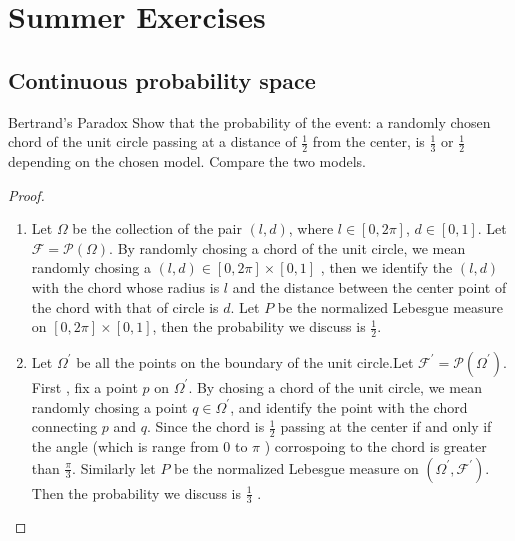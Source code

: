 \documentclass[../main.tex]{subfiles}
\begin{document}
\ifSubfilesClassLoaded{

    \tableofcontents
    
}{}

\chapter{ Summer Exercises }

\section{Continuous probability space}

\begin{exercise}{Bertrand's Paradox}{}
    Show that the probability of the event: a randomly chosen chord of the unit circle passing at a distance of $\frac{1}{2}$ from the center, is $\frac{1}{3}$ or $\frac{1}{2}$ depending on the chosen model. Compare the two models.
\end{exercise}

\begin{proof}
    \begin{enumerate}
        \item Let \(   \Omega   \) be the collection of the pair \(  \left( l, d \right)   \), where \(  l\in \left[ 0,2 \pi \right]   \), \(  d \in \left[ 0,1 \right]   \).  Let \(  \mathcal{F}= \mathcal{P}\left(  \Omega  \right)   \).  By randomly chosing a chord of the unit circle, we mean randomly chosing a \(  \left( l,d \right) \in \left[ 0,2 \pi \right]\times \left[ 0,1 \right]     \) , then we identify the \(  \left( l,d \right)   \) with the chord whose radius is  \(  l  \) and the distance between the center point  of the chord with that of circle is \(  d  \). Let \(  P  \) be the normalized  Lebesgue measure on \(  \left[ 0,2 \pi \right]\times \left[ 0,1 \right]    \), then the probability we discuss is \(  \frac{1}{2}  \).     
        \item Let \(   \Omega ^{\prime}   \) be all the    points on the boundary of the unit circle.Let \(  \mathcal{F}^{\prime} = \mathcal{P}\left(  \Omega ^{\prime}  \right)   \).   First , fix a point \(  p  \) on \(   \Omega ^{\prime}   \).     By chosing a chord of the unit circle, we mean randomly chosing a point  \(q\in    \Omega ^{\prime}   \), and identify the point with the chord connecting \(  p  \)   and \(  q  \). Since  the chord is \(  \frac{1}{2}  \) passing at the center if and only if  the angle (which is range from \(  0  \) to \(    \pi  \)  ) corrospoing to the  chord is greater than \(  \frac{ \pi }{3 }   \). Similarly let \(  P  \) be the normalized  Lebesgue measure on \(  \left(  \Omega ^{\prime} ,\mathcal{F}^{\prime}  \right)   \). Then the probability we discuss is \(  \frac{1}{3}  \) .     
    \end{enumerate}
    
\end{proof}
\end{document}
